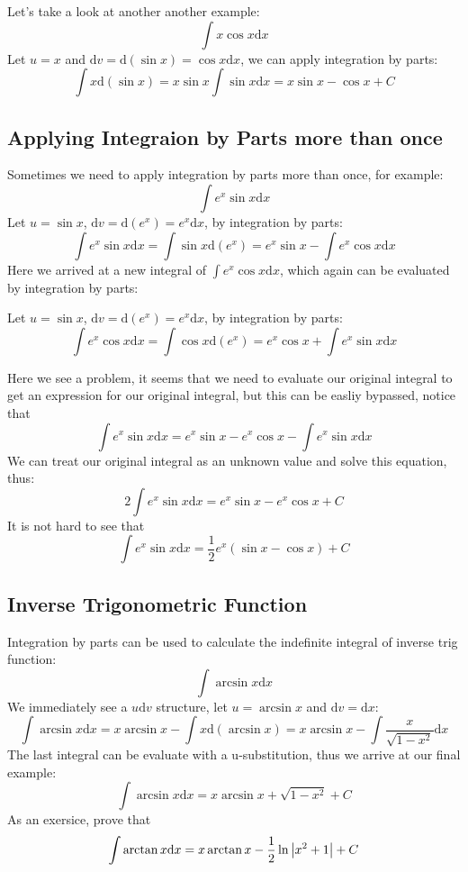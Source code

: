 \documentclass{article}
\numberwithin{equation}{section}
\begin{document}
Let's take a look at another another example:
\[
\int x\cos x \mathrm{d}x
\]
Let $u = x$ and $\mathrm{d}v = \mathrm{d}(\sin x) = \cos x \mathrm{d}x$, we can apply integration by parts:
\[
\int x \mathrm{d}(\sin x) = x\sin x \int \sin x \mathrm{d}x = x \sin x - \cos x + C
\]

\newpage
\subsection{Applying Integraion by Parts more than once}
Sometimes we need to apply integration by parts more than once, for example:
\[
\int e^x \sin x \mathrm{d}x
\]
Let $u = \sin x$, $\mathrm{d}v = \mathrm{d}(e^x) = e^x \mathrm{d}x$, by integration by parts:
\[
\int e^x \sin x \mathrm{d}x = \int \sin x \mathrm{d}(e^x) = e^x \sin x - \int e^x \cos x \mathrm{d}x
\]
Here we arrived at a new integral of $\int e^x \cos x \mathrm{d}x$, which again can be evaluated by integration by parts:

Let $u = \sin x$, $\mathrm{d}v = \mathrm{d}(e^x) = e^x \mathrm{d}x$, by integration by parts:
\[
\int e^x \cos x \mathrm{d}x = \int \cos x \mathrm{d}(e^x) = e^x \cos x + \int e^x \sin x \mathrm{d}x
\]

Here we see a problem, it seems that we need to evaluate our original integral to get an expression for our original integral, but this can be easliy bypassed,
notice that
\[
\int e^x \sin x \mathrm{d}x = e^x \sin x - e^x \cos x - \int e^x \sin x \mathrm{d}x
\]
We can treat our original integral as an unknown value and solve this equation, thus:
\[
2 \int e^x \sin x \mathrm{d}x = e^x \sin x - e^x \cos x + C
\]
It is not hard to see that
\[
\int e^x \sin x \mathrm{d}x = \frac{1}{2}e^x (\sin x - \cos x) + C
\]

\subsection{Inverse Trigonometric Function}
Integration by parts can be used to calculate the indefinite integral of inverse trig function:
\[
\int \arcsin x \mathrm{d}x
\]
We immediately see a $u\mathrm{d}v$ structure, let $u=\arcsin x$ and $\mathrm{d}v = \mathrm{d}x$:
\[
\int \arcsin x \mathrm{d}x = x\arcsin x - \int x \mathrm{d}(\arcsin x) = x\arcsin x - \int \frac{x}{\sqrt{1-x^2}} \mathrm{d}x
\]
The last integral can be evaluate with a u-substitution, thus we arrive at our final example:
\[
\int \arcsin x \mathrm{d}x = x\arcsin x + \sqrt{1-x^2} + C
\]
As an exersice, prove that
\[
\int \arctan{x} \mathrm{d}x = x\arctan{x} -\frac{1}{2}\ln{\abs{x^2 + 1}} + C
\]
\end{document}
